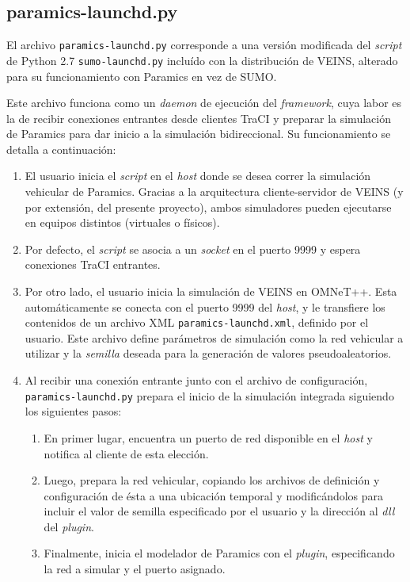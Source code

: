 \subsection{paramics-launchd.py}

El archivo \texttt{paramics-launchd.py} corresponde a una versión modificada del \emph{script} de Python 2.7 \texttt{sumo-launchd.py} incluído con la distribución de VEINS, alterado para su funcionamiento con Paramics en vez de SUMO.

Este archivo funciona como un \emph{daemon} de ejecución del \emph{framework}, cuya labor es la de recibir conexiones entrantes desde clientes TraCI y preparar la simulación de Paramics para dar inicio a la simulación bidireccional. Su funcionamiento se detalla a continuación:

\begin{enumerate}
    \item El usuario inicia el \emph{script} en el \emph{host} donde se desea correr la simulación vehicular de Paramics. Gracias a la arquitectura cliente-servidor de VEINS (y por extensión, del presente proyecto), ambos simuladores pueden ejecutarse en equipos distintos (virtuales o físicos).
    
    \item Por defecto, el \emph{script} se asocia a un \emph{socket} en el puerto 9999 y espera conexiones TraCI entrantes.
    
    \item Por otro lado, el usuario inicia la simulación de VEINS en OMNeT++. Esta automáticamente se conecta con el puerto 9999 del \emph{host}, y le transfiere los contenidos de un archivo XML \texttt{paramics-launchd.xml}, definido por el usuario. Este archivo define parámetros de simulación como la red vehicular a utilizar y la \emph{semilla} deseada para la generación de valores pseudoaleatorios.
    

    
    \item Al recibir una conexión entrante junto con el archivo de configuración, \texttt{paramics-launchd.py} prepara el inicio de la simulación integrada siguiendo los siguientes pasos:
    
    \begin{enumerate}
        \item En primer lugar, encuentra un puerto de red disponible en el \emph{host} y notifica al cliente de esta elección.
        \item Luego, prepara la red vehicular, copiando los archivos de definición y configuración de ésta a una ubicación temporal y modificándolos para incluir el valor de semilla especificado por el usuario y la dirección al \emph{dll} del \emph{plugin}.
        \item Finalmente, inicia el modelador de Paramics con el \emph{plugin}, especificando la red a simular y el puerto asignado.
    \end{enumerate}


\end{enumerate}
